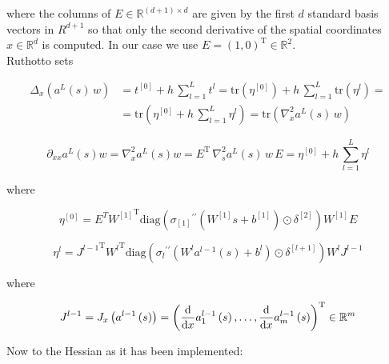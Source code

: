 where the columns of $E \in \mathbb{R}^{\left(d+1\right) \times d}$ are given by the first $d$ standard basis vectors in $R^{d+1}$ so that only the second derivative of the spatial coordinates $x \in \mathbb{R}^d$ is computed. In our case we use $E = \left(1, 0\right)^{\mathrm{T}} \in \mathbb{R}^{2}$. \\
Ruthotto sets

\begin{align*}
    \Delta_x \left(a^{L}\left(s\right) \, w\right) & = t^{[0]} + h \, \sum^{L}_{l=1} t^{l} = \mathrm{tr}\left(\eta^{[0]}\right) + h \, \sum^{L}_{l=1} \mathrm{tr}\left(\eta^{l}\right) = \\
    & = \mathrm{tr} \left( \eta^{[0]} + h \, \sum^{L}_{l=1} \eta^{l} \right) = \mathrm{tr} \left( \nabla^{2}_x a^{L}\left(s\right) \, w \right)
\end{align*}

\begin{equation*}
    \partial_{xx} a^{L}\left(s\right) w = \nabla^{2}_x a^{L}\left(s\right) w = E^{\mathrm{T}} \, \nabla^{2}_s a^{L}\left(s\right) \, w \, E = \eta^{[0]} + h \, \sum^{L}_{l=1} \eta^{l}
\end{equation*}

where 

\begin{equation*}
    \eta^{[0]} = E^T {W^{[1]}}^{\mathrm{T}} \mathrm{diag}\left({\sigma_{[1]}}^{\prime \prime}\left(W^{[1]} s + b^{[1]}\right) \odot \delta^{[2]}\right) W^{[1]} E
\end{equation*}

\begin{equation*}
    \eta^{l} = {J^{l-1}}^{\mathrm{T}} {W^{l}}^{\mathrm{T}} \mathrm{diag}\left({\sigma_{l}}^{\prime \prime}\left(W^{l} a^{l-1}\left(s\right) + b^{l}\right) \odot \delta^{[l+1]}\right) W^{l} J^{l-1}
\end{equation*}

where 

\begin{equation*}
    J^{l-1} = J_x\left(a^{l-1}\left(s\right)\right) = \left( \frac{\textup{d}}{\textup{d} x} a^{l-1}_1\left(s\right), \ldots, \frac{\textup{d}}{\textup{d} x} a^{l-1}_m\left(s\right) \right)^{\mathrm{T}} \in \mathbb{R}^{m}
\end{equation*}


Now to the Hessian as it has been implemented: 

